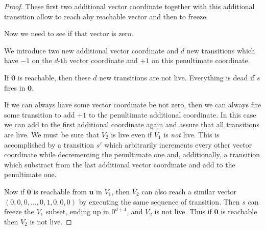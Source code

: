\begin{proof}
These first two additional vector coordinate together with this additional transition allow
to reach aby reachable vector and then to freeze.


Now we need to see if that vector is zero.

We introduce two new additional vector coordinate and $d$ new transitions which have
$-1$ on the $d$-th vector coordinate and $+1$ on this penultimate coordinate. 


If $\textbf{0}$ is reachable, then these $d$ new transitions are not live. Everything is dead if $s$ fires in $\textbf{0}$.


If we can always have some vector coordinate be not zero, then we can always fire some transition to add $+1$ to the penultimate additional coordinate.
In this case we can add to the first additional coordinate again and assure that all transitions are live.
We must be sure that $V_2$ is live even if $V_1$ is {\em not} live.
This is accomplished by a transition $s'$ which arbitrarily increments every other vector coordinate 
while decrementing the penultimate one and, additionally, a transition which 
substract from the last additional vector coordinate and add to the penultimate one. 


Now if $\textbf{0}$ is reachable from $\textbf{u}$ in $V_1$, then $V_2$ can also reach a similar
vector $(0,0,0,\ldots, 0, 1,0,0,0)$ by executing the same sequence of transition.
Then $s$ can freeze the $V_1$ subset,
ending up in $0^{d+4}$, and $V_2$ is not live.
Thus if $\textbf{0}$ is reachable then $V_2$ is not live.



\end{proof}
